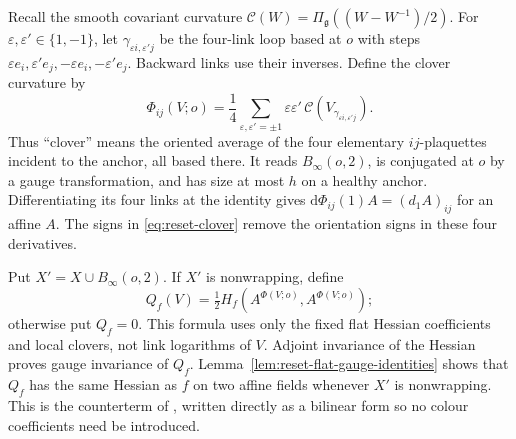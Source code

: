 \documentclass[11pt,reqno]{amsart}
\numberwithin{equation}{section}
\theoremstyle{definition}
\theoremstyle{remark}
\newcommand{\dd}{\mathrm d}
\newcommand{\g}{\mathfrak g}
\begin{document}
Recall the smooth covariant curvature
\(\mathcal C(W)=\Pi_\g((W-W^{-1})/2)\). For
\(\varepsilon,\varepsilon'\in\{1,-1\}\), let
\(\gamma_{\varepsilon i,\varepsilon'j}\) be the four-link
loop based at \(o\) with steps
\(\varepsilon e_i,\varepsilon'e_j,-\varepsilon e_i,
-\varepsilon'e_j\). Backward links use their inverses.
Define the clover curvature by
\begin{equation}
 \Phi_{ij}(V;o)=\frac14\sum_{\varepsilon,\varepsilon'=\pm1}
       \varepsilon\varepsilon'\,
                    \mathcal C(V_{\gamma_{\varepsilon i,\varepsilon'j}}).
 \label{eq:reset-clover}
\end{equation}
Thus ``clover'' means the oriented average of the four
elementary \(ij\)-plaquettes incident to the anchor, all
based there. It reads \(B_\infty(o,2)\), is conjugated at
\(o\) by a gauge transformation, and has size at most \(h\)
on a healthy anchor. Differentiating its four links at the
identity gives
\(\dd\Phi_{ij}(1)A=(d_1A)_{ij}\) for an affine \(A\).
The signs in \eqref{eq:reset-clover} remove the orientation
signs in these four derivatives.

Put \(X'=X\cup B_\infty(o,2)\). If \(X'\) is nonwrapping,
define
\begin{equation}
            Q_f(V)=\tfrac12 H_f(A^{\Phi(V;o)},A^{\Phi(V;o)});
 \label{eq:reset-quadratic-counterterm}
\end{equation}
otherwise put \(Q_f=0\). This formula uses only the fixed
flat Hessian coefficients and local clovers, not link
logarithms of \(V\). Adjoint invariance of the Hessian
proves gauge invariance of \(Q_f\). Lemma~\ref{lem:reset-flat-gauge-identities}
shows that \(Q_f\) has the same Hessian as \(f\) on two
affine fields whenever \(X'\) is nonwrapping. This is the
counterterm of \cite[(13.6), p.~48]{Main}, written directly
as a bilinear form so no colour coefficients need be introduced.
\end{document}
